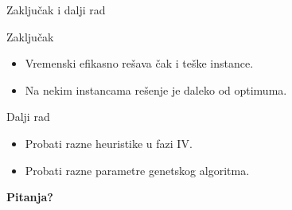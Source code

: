\documentclass[aspectratio=169,xcolor=dvipsnames]{beamer}
\begin{document}
\begin{frame}{Zaključak i dalji rad}
    \begin{block}{Zaključak}
        \begin{itemize}
            \item Vremenski efikasno rešava čak i teške instance.
            \item Na nekim instancama rešenje je daleko od optimuma.
        \end{itemize}
    \end{block}
    \begin{block}{Dalji rad}
        \begin{itemize}
            \item Probati razne heuristike u fazi IV.\
            \item Probati razne parametre genetskog algoritma.
        \end{itemize}
        
    \end{block}
\end{frame}


\begin{frame}
    \Huge{\centerline{\textbf{Pitanja?}}}
\end{frame}

\end{document}
